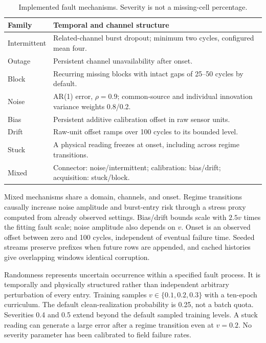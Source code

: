 \documentclass[conference]{IEEEtran}
\begin{document}
\begin{table}[!t]
\caption{Implemented fault mechanisms. Severity is not a missing-cell percentage.}
\label{tab:fault_mechanisms}
\centering\footnotesize
\begin{tabular}{p{}p{}}
\toprule Family & Temporal and channel structure\\\midrule
Intermittent & Related-channel burst dropout; minimum two cycles, configured mean four.\\
Outage & Persistent channel unavailability after onset.\\
Block & Recurring missing blocks with intact gaps of 25--50 cycles by default.\\
Noise & AR(1) error, $\rho=0.9$; common-source and individual innovation variance weights 0.8/0.2.\\
Bias & Persistent additive calibration offset in raw sensor units.\\
Drift & Raw-unit offset ramps over 100 cycles to its bounded level.\\
Stuck & A physical reading freezes at onset, including across regime transitions.\\
Mixed & Connector: noise/intermittent; calibration: bias/drift; acquisition: stuck/block.\\\bottomrule
\end{tabular}
\end{table}

Mixed mechanisms share a domain, channels, and onset. Regime transitions causally increase noise amplitude and burst-entry risk through a stress proxy computed from already observed settings. Bias/drift bounds scale with $2.5v$ times the fitting fault scale; noise amplitude also depends on $v$. Onset is an observed offset between zero and 100 cycles, independent of eventual failure time. Seeded streams preserve prefixes when future rows are appended, and cached histories give overlapping windows identical corruption.

Randomness represents uncertain occurrence within a specified fault process. It is temporally and physically structured rather than independent arbitrary perturbation of every entry. Training samples $v\in\{0.1,0.2,0.3\}$ with a ten-epoch curriculum. The default clean-realization probability is 0.25, not a batch quota. Severities 0.4 and 0.5 extend beyond the default sampled training levels. A stuck reading can generate a large error after a regime transition even at $v=0.2$. No severity parameter has been calibrated to field failure rates.
\end{document}
